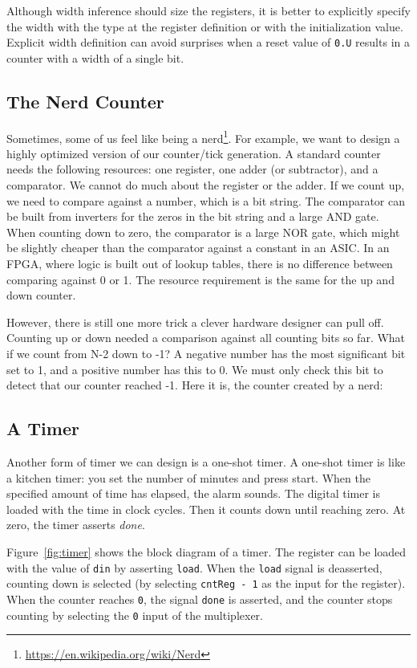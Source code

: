 \documentclass[%
    10pt,
    headinclude, footinclude=false,
    openright, %
    notitlepage,
    cleardoublepage=empty,
    headsepline,
    numbers=noenddot,
    bibliography=totoc, index=totoc,
    ]{scrbook}
\newcommand{\code}[1]{{\lstinline[basicstyle=\small\ttfamily]{#1}}}
\newcommand{\myref}[2]{\href{#1}{#2}}
\renewcommand{\myref}[2]{{#2}{\footnote{\url{#1}}}}
\begin{document}
Although width inference should size the registers, it is better to explicitly
specify the width with the type at the register definition or with the
initialization value. Explicit width definition can avoid surprises when a reset value of \code{0.U}
results in a counter with a width of a single bit.

\subsection{The Nerd Counter}

Sometimes, some of us feel like being a \myref{https://en.wikipedia.org/wiki/Nerd}{nerd}.
For example, we want to design a highly optimized version of our counter/tick generation.
A standard counter needs the following resources: one register, one adder (or subtractor),
and a comparator. We cannot do much about the register or the adder. If we count
up, we need to compare against a number, which is a bit string. The comparator
can be built from inverters for the zeros in the bit string and a large AND gate.
When counting down to zero, the comparator is a large NOR gate, which might be
slightly cheaper than the comparator against a constant in an ASIC.
In an FPGA, where logic is built out of lookup tables, there is no difference between comparing
against 0 or 1. The resource requirement is the same for the up and down counter.

However, there is still one more trick a clever hardware designer can pull off.
Counting up or down needed a comparison against all counting bits so far.
What if we count from N-2 down to -1? A negative number has the most significant bit
set to 1, and a positive number has this to 0. We must only check this bit to detect
that our counter reached -1. Here it is, the counter created by a nerd:



\subsection{A Timer}

Another form of timer we can design is a one-shot timer. A one-shot timer is like a
kitchen timer: you set the number of minutes and press start. When the specified amount
of time has elapsed, the alarm sounds.
The digital timer is loaded with the time in clock cycles.
Then it counts down until reaching zero. At zero, the timer asserts \emph{done}.

Figure~\ref{fig:timer} shows the block diagram of a timer. The register can be loaded with
the value of \code{din} by asserting \code{load}. When the \code{load} signal is deasserted,
counting down is selected (by selecting \code{cntReg - 1} as the input for the register).
When the counter reaches \code{0}, the signal \code{done} is asserted, and the counter stops
counting by selecting the \code{0} input of the multiplexer.
\end{document}
